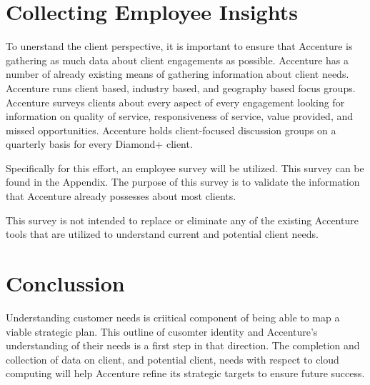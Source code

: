 \section{Collecting Employee Insights}

To unerstand the client perspective, it is important to ensure that Accenture is gathering as much data about client engagements as possible. Accenture has a number of already existing means of gathering information about client needs. Accenture runs client based, industry based, and geography based focus groups. Accenture surveys clients about every aspect of every engagement looking for information on quality of service, responsiveness of service, value provided, and missed opportunities. Accenture holds client-focused discussion groups on a quarterly basis for every Diamond+ client.

Specifically for this effort, an employee survey will be utilized. This survey can be found in the Appendix. The purpose of this survey is to validate the information that Accenture already possesses about most clients.

This survey is not intended to replace or eliminate any of the existing Accenture tools that are utilized to understand current and potential client needs.

\section{Conclussion}

Understanding customer needs is criitical component of being able to map a viable strategic plan. This outline of cusomter identity and Accenture's understanding of their needs is a first step in that direction. The completion and collection of data on client, and potential client, needs with respect to cloud computing will help Accenture refine its strategic targets to ensure future success.
